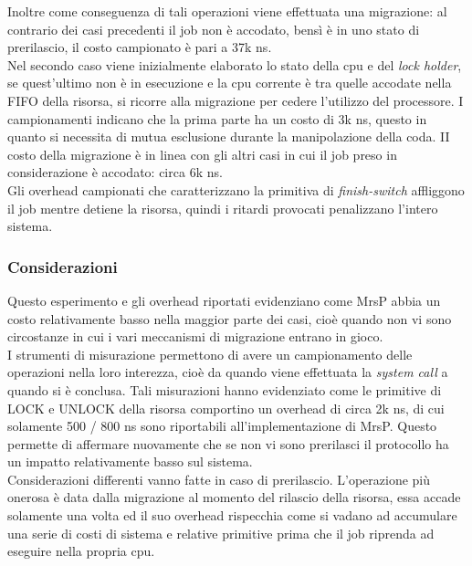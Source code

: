 \noindent Inoltre come conseguenza di tali operazioni viene effettuata una migrazione: al contrario dei casi precedenti il job non è accodato, bensì è in uno stato di prerilascio, il costo campionato è pari a 37k ns.\\

\noindent Nel secondo caso viene inizialmente elaborato lo stato della cpu e del \textit{lock holder}, se quest'ultimo non è in esecuzione e la cpu corrente è tra quelle accodate nella FIFO della risorsa, si ricorre alla migrazione per cedere l'utilizzo del processore. I campionamenti indicano che la prima parte ha un costo di 3k ns, questo in quanto si necessita di mutua esclusione durante la manipolazione della coda. II costo della migrazione è in linea con gli altri casi in cui il job preso in considerazione è accodato: circa 6k ns.\\

\noindent Gli overhead campionati che caratterizzano la primitiva di \textit{finish-switch} affliggono il job mentre detiene la risorsa, quindi i ritardi provocati penalizzano l'intero sistema.

\subsubsection{Considerazioni}
\label{sec:overhead_cons}

\noindent Questo esperimento e gli overhead riportati evidenziano come MrsP abbia un costo relativamente basso nella maggior parte dei casi, cioè quando non vi sono circostanze in cui i vari meccanismi di migrazione entrano in gioco.\\

\noindent I strumenti di misurazione permettono di avere un campionamento delle operazioni nella loro interezza, cioè da quando viene effettuata la \textit{system call} a quando si è conclusa. Tali misurazioni hanno evidenziato come le primitive di LOCK e UNLOCK della risorsa comportino un overhead di circa 2k ns, di cui solamente 500 / 800 ns sono riportabili all'implementazione di MrsP. Questo permette di affermare nuovamente che se non vi sono prerilasci il protocollo ha un impatto relativamente basso sul sistema.\\

\noindent Considerazioni differenti vanno fatte in caso di prerilascio. L'operazione più onerosa è data dalla migrazione al momento del rilascio della risorsa, essa accade solamente una volta ed il suo overhead rispecchia come si vadano ad accumulare una serie di costi di sistema e relative primitive prima che il job riprenda ad eseguire nella propria cpu.\\


